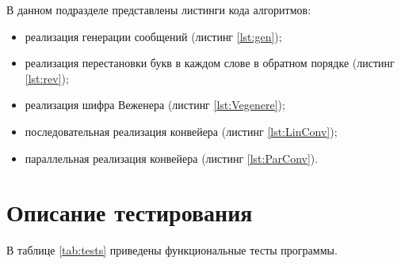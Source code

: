 В данном подразделе представлены листинги кода алгоритмов:
\begin{itemize}[]
    \item реализация генерации сообщений (листинг \ref{lst:gen});
    \item реализация перестановки букв в каждом слове в обратном
          порядке (листинг \ref{lst:rev});
    \item реализация шифра Веженера (листинг \ref{lst:Vegenere});
    \item последовательная реализация конвейера (листинг \ref{lst:LinConv});
    \item параллельная реализация конвейера (листинг \ref{lst:ParConv}).
\end{itemize}

%
%
%    
%
%    

\section{Описание тестирования}

В таблице \ref{tab:tests} приведены функциональные тесты программы.

